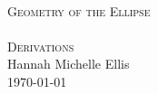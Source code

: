 \begin{titlepage}
\begin{center}
\HRule \\[0.5cm]
\textsc{\huge Geometry of the Ellipse}\\[0.5cm]
\HRule \\[0.5cm]
\textsc{\Large Derivations}\\[0.5cm]
\vfill
Hannah Michelle Ellis\\[1.0cm]
\today
\end{center}
\end{titlepage}

